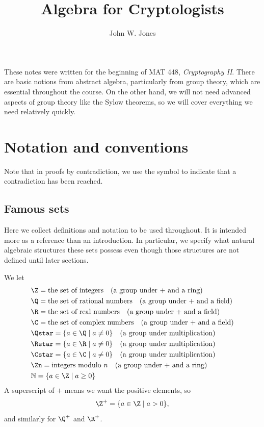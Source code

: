 \documentclass[12pt]{amsart}
\title{Algebra for Cryptologists}
\author{John W.{} Jones}
\theoremstyle{plain}
\theoremstyle{definition}
\theoremstyle{remark}
\begin{document}
\maketitle

These notes were written for the beginning of MAT 448, \emph{Cryptography
II}.  There are basic notions from abstract algebra, particularly from
group theory, which are essential
throughout the course.  On the other hand, we will not need advanced
aspects of group theory like the Sylow theorems, so we will cover
everything we need relatively quickly.


\tableofcontents

\section{Notation and conventions}
Note that in proofs by contradiction, we use the symbol \con{} to
indicate that a contradiction has been reached.

\subsection{Famous sets}
Here we collect definitions and notation to be used throughout.  It is
intended more as a reference than an introduction.  In particular, we
specify what natural algebraic structures these sets possess even
though those structures are not defined until later sections.

We let
\begin{align*}
&\Z = \text{the set of integers} \quad\text{(a group under $+$ and a ring)} \\
&\Q = \text{the set of rational numbers}  \quad\text{(a group under $+$ and a field)} \\
&\R = \text{the set of real numbers}  \quad\text{(a group under $+$ and a field)} \\
&\C= \text{the set of complex numbers} \quad\text{(a group under $+$ and a field)} \\
&\Qstar= \{a\in\Q\mid a\neq 0\} \quad\text{(a group under multiplication)}\\
&\Rstar= \{a\in\R\mid a\neq 0\} \quad\text{(a group under multiplication)}\\
&\Cstar= \{a\in\C\mid a\neq 0\}\quad\text{(a group under multiplication)}\\
&\Zn = \text{integers modulo $n$} \quad\text{(a group under $+$ and a ring)} \\
&\mathbb N=\{a\in\Z\mid a\geq 0\} 
\end{align*}
A superscript of $+$ means we want the positive elements, so
$$\Z^+=\{a\in \Z\mid a>0\},$$ and similarly for $\Q^+$ and $\R^+$.
\end{document}
